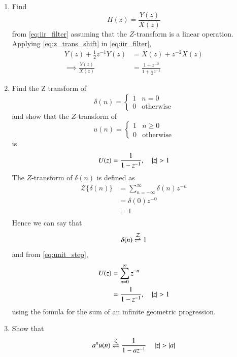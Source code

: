 \documentclass[journal,12pt,twocolumn]{IEEEtran}
\renewcommand\thesection{\arabic{section}}
\begin{document}
\begin{enumerate}[label=\thesection.\arabic*]
\item Find
%
\begin{equation}
H(z) = \frac{Y(z)}{X(z)}
\end{equation}
%
from  \eqref{eq:iir_filter} assuming that the $Z$-transform is a linear operation.
\\
\solution  Applying \eqref{eq:z_trans_shift} in \eqref{eq:iir_filter},
\begin{align}
Y(z) + \frac{1}{2}z^{-1}Y(z) &= X(z)+z^{-2}X(z)
\\
\implies \frac{Y(z)}{X(z)} &= \frac{1 + z^{-2}}{1 + \frac{1}{2}z^{-1}}
\label{eq:freq_resp}
\end{align}
%
\item Find the Z transform of 
\begin{equation}
\delta(n)
=
\begin{cases}
1 & n = 0
\\
0 & \text{otherwise}
\end{cases}
\end{equation}
and show that the $Z$-transform of
\begin{equation}
\label{eq:unit_step}
u(n)
=
\begin{cases}
1 & n \ge 0
\\
0 & \text{otherwise}
\end{cases}
\end{equation}
is
\begin{equation}
U(z) = \frac{1}{1-z^{-1}}, \quad \left\vert z\right\vert > 1
\end{equation}
\solution The $Z$-transform of $\delta(n)$ is defined as
\begin{align}
	{\mathcal {Z}}\{\delta(n)\}&=\sum _{n=-\infty }^{\infty }\delta(n)z^{-n}\\
	&=\delta(0)z^{-0}\\
	&=1\\
\end{align}
Hence we can say that
\begin{equation}
\label{eq:z_trans}
\delta(n) \overset{\mathcal{Z}}{ \rightleftharpoons} 1
\end{equation}
and from \eqref{eq:unit_step},
\begin{align}
U(z) &= \sum _{n= 0}^{\infty}z^{-n}
\\
&=\frac{1}{1-z^{-1}}, \quad \left\vert z\right\vert > 1
\end{align}
using the fomula for the sum of an infinite geometric progression.
%
\item Show that 
\begin{equation}
\label{eq:anun}
a^nu(n) \ztrans \frac{1}{1-az^{-1}} \quad \abs{z} > \abs{a}

\end{equation}
\end{enumerate}
\end{document}
